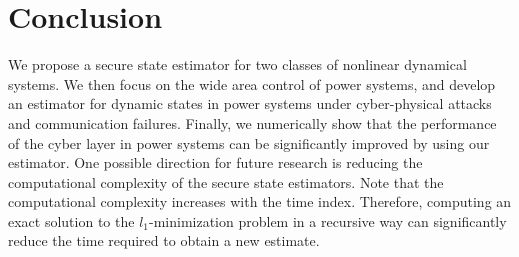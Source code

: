 \documentclass[../../thesis.tex]{subfiles}
\begin{document}





\section{Conclusion}
We propose a secure state estimator for two classes of nonlinear dynamical systems. We then focus on the wide area control of power systems, and develop an estimator for dynamic states in power systems under cyber-physical attacks and communication failures. Finally, we numerically show that the performance of the cyber layer in power systems can be significantly improved by using our estimator. One possible direction for future research is reducing the computational complexity of the secure state estimators. Note that the computational complexity increases with the time index. Therefore, computing an exact solution to the $l_1$-minimization problem in a recursive way can significantly reduce the time required to obtain a new estimate.
\end{document}
